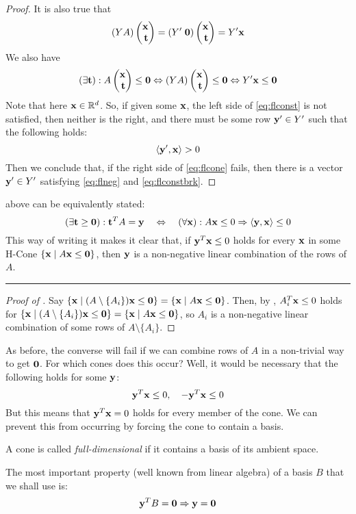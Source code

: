 \begin{proof}
	It is also true that
	\[ (YA)\xt = (Y'\;\0)\xt = Y'\x \]
	We also have
	\begin{equation}\label{eq:flconst}
		(\exists \t) : A \xt \leq \0 \Leftrightarrow
		(YA)\xt \leq \0 \Leftrightarrow
		Y'\x \leq \0
	\end{equation}
	Note that here $\mathbf{x} \in \mathbb{R}^d$.  So, if given some $\mathbf{x}$, the left side of \eqref{eq:flconst} is not satisfied, then neither is the right, and there must be some row $\mathbf{y}' \in Y'$ such that the following holds:
	\begin{equation}\label{eq:flconstbrk} \left\langle \mathbf{y}', \mathbf{x} \right\rangle > 0 \end{equation}
	Then we conclude that, if the right side of \eqref{eq:flcone} fails, then there is a vector $\mathbf{y}' \in Y'$ satisfying \eqref{eq:flneg} and \eqref{eq:flconstbrk}.
\end{proof}

\begin{Remark}\label{valid_cone_ineq}
	 above can be equivalently stated:
	\[ (\exists \mathbf{t} \geq \mathbf{0}) : \mathbf{t}^T A = \mathbf{y} \quad\Leftrightarrow\quad
		(\forall \mathbf{x}) : A\mathbf{x} \leq 0 \Rightarrow \left\langle \mathbf{y}, \mathbf{x} \right\rangle \leq 0 \]
	This way of writing it makes it clear that, if $\mathbf{y}^T\mathbf{x}\leq 0$ holds for every $\mathbf{x}$ in some H-Cone $\left\{\mathbf{x}\;|\; A\mathbf{x}\leq\mathbf{0}\right\}$, then $\mathbf{y}$ is a non-negative linear combination of the rows of $A$.
\end{Remark}

\hrule

\begin{proof}[Proof of ]
	Say $\left\{\mathbf{x}\;|\; (A\setminus\{A_i\})\mathbf{x}\leq\mathbf{0}\right\} = \left\{\mathbf{x}\;|\; A\mathbf{x}\leq\mathbf{0}\right\}$.  Then, by , $A_i^T\mathbf{x}\leq 0$ holds for $\left\{\mathbf{x}\;|\; (A\setminus\{A_i\})\mathbf{x}\leq\mathbf{0}\right\} = \left\{\mathbf{x}\;|\; A\mathbf{x}\leq\mathbf{0}\right\}$, so $A_i$ is a non-negative linear combination of some rows of $A\setminus\{A_i\}$.
\end{proof}

As before, the converse will fail if we can combine rows of $A$ in a non-trivial way to get $\mathbf{0}$.  For which cones does this occur?  Well, it would be necessary that the following holds for some $\mathbf{y}$:
\[ \mathbf{y}^T\mathbf{x} \leq 0,\quad -\mathbf{y}^T\mathbf{x}\leq 0 \]
But this means that $\mathbf{y}^T\mathbf{x} = 0$ holds for every member of the cone.  We can prevent this from occurring by forcing the cone to contain a basis.

\begin{Def}
	A cone is called \textit{full-dimensional} if it contains a basis of its ambient space.
\end{Def}

The most important property (well known from linear algebra) of a basis $B$ that we shall use is:
\begin{equation}
	\mathbf{y}^T B = \mathbf{0} \Rightarrow \mathbf{y} = \mathbf{0} \label{basis_li}
\end{equation}

